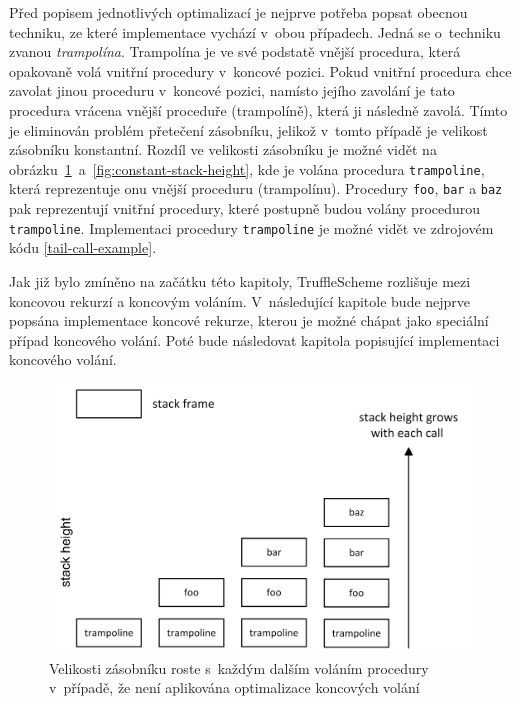 \documentclass[
  master,
  biblatex,
  figures=true,
  theorems,
  sourcecodes,
  glossaries,
  index
]{kidiplom}
\begin{document}
Před popisem jednotlivých optimalizací je nejprve potřeba popsat obecnou techniku, ze které implementace vychází v~obou případech. Jedná se o~techniku zvanou \textit{trampolína}. Trampolína je ve své podstatě vnější procedura, která opakovaně volá vnitřní procedury v~koncové pozici. Pokud vnitřní procedura chce zavolat jinou proceduru v~koncové pozici, namísto jejího zavolání je tato procedura vrácena vnější proceduře (trampolíně), která ji následně zavolá. Tímto je eliminován problém přetečení zásobníku, jelikož v~tomto případě je velikost zásobníku konstantní. Rozdíl ve velikosti zásobníku je možné vidět na obrázku~\ref{fig:growing-stack-height}~a~\ref{fig:constant-stack-height}, kde je volána procedura \texttt{trampoline}, která reprezentuje onu vnější proceduru (trampolínu). Procedury \texttt{foo}, \texttt{bar} a \texttt{baz} pak reprezentují vnitřní procedury, které postupně budou volány procedurou \texttt{trampoline}. Implementaci procedury \texttt{trampoline} je možné vidět ve zdrojovém kódu \ref{tail-call-example}. \cite{trampile-jvm-elimination-techniques}

Jak již bylo zmíněno na začátku této kapitoly, TruffleScheme rozlišuje mezi koncovou rekurzí a koncovým voláním. V~následující kapitole bude nejprve popsána implementace koncové rekurze, kterou je možné chápat jako speciální případ koncového volání. Poté bude následovat kapitola popisující implementaci koncového volání.


\begin{figure} [h]
    \centering
    \includegraphics[width= 1\textwidth]{images/stack_frame.png}
    \caption{Velikosti zásobníku roste s~každým dalším voláním procedury v~případě, že není aplikována optimalizace koncových volání \cite{truffle-clojure}}
    \label{fig:growing-stack-height}
\end{figure}
\end{document}
